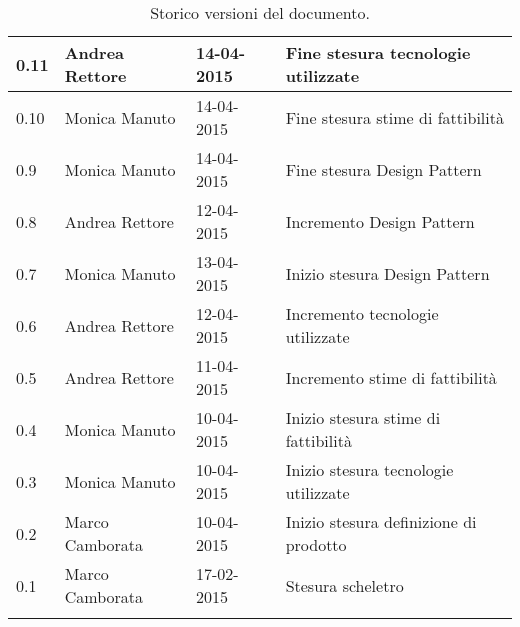 \begin{longtable}{|l|l|l|p{}|}
\hline
0.11 & Andrea Rettore & 14-04-2015 & Fine stesura tecnologie utilizzate \\
\hline
0.10 & Monica Manuto & 14-04-2015 & Fine stesura stime di fattibilità \\
\hline
0.9 & Monica Manuto & 14-04-2015 & Fine stesura Design Pattern \\
\hline
0.8 & Andrea Rettore & 12-04-2015 & Incremento Design Pattern \\
\hline
0.7 & Monica Manuto & 13-04-2015 & Inizio stesura Design Pattern \\
\hline
0.6 & Andrea Rettore & 12-04-2015 & Incremento tecnologie utilizzate \\
\hline
0.5 & Andrea Rettore & 11-04-2015 & Incremento stime di fattibilità \\
\hline
0.4 & Monica Manuto & 10-04-2015 & Inizio stesura stime di fattibilità \\
\hline
0.3 & Monica Manuto & 10-04-2015 & Inizio stesura tecnologie utilizzate \\
\hline
0.2 & Marco Camborata & 10-04-2015 & Inizio stesura definizione di prodotto \\
\hline
0.1 & Marco Camborata & 17-02-2015 & Stesura scheletro \\
\hline
\caption{Storico versioni del documento.}
\end{longtable}
